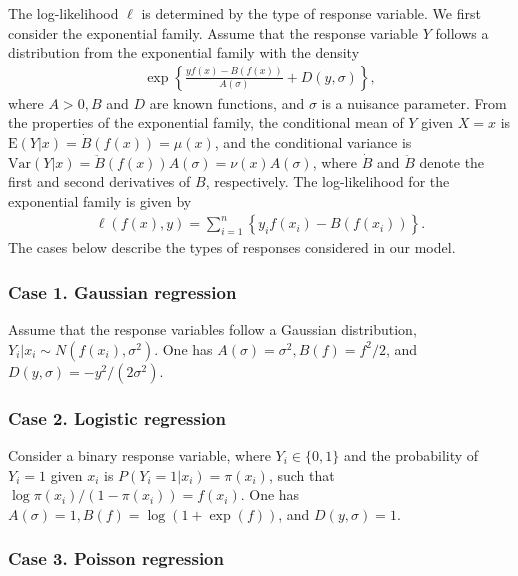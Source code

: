 The log-likelihood \(\ell\) is determined by the type of response variable. We first consider the exponential family. Assume that the response variable \(Y\) follows a distribution from the exponential family with the density
\begin{align*}
    \exp \left\{ \frac{y f(x) - B(f(x))}{A(\sigma)} + D(y, \sigma) \right\},
\end{align*}
where \(A > 0, B\) and \(D\) are known functions, and \(\sigma\) is a nuisance parameter. From the properties of the exponential family, the conditional mean of \(Y\) given \(X = x\) is \(\mathrm{E}(Y|x) = \dot{B}(f(x)) = \mu(x)\), and the conditional variance is \(\text{Var}(Y|x) = \ddot{B}(f(x)) A(\sigma) = \nu(x) A(\sigma)\), where \(\dot{B}\) and \(\ddot{B}\) denote the first and second derivatives of \(B\), respectively. The log-likelihood for the exponential family is given by
\begin{align}
    \ell(f(x), y) = \sum_{i=1}^{n} \left\{ y_i f(x_i) - B(f(x_i)) \right\}.
    \label{eq:loglik} 
\end{align}
The cases below describe the types of responses considered in our model.

\hypertarget{case-1.-gaussian-regression}{%
\subsubsection{Case 1. Gaussian regression}\label{case-1.-gaussian-regression}}

Assume that the response variables follow a Gaussian distribution, \(Y_i|x_i \sim N(f(x_i), \sigma^2)\). One has \(A(\sigma) = \sigma^2, B(f) = f^2/2\), and \(D(y, \sigma) = -y^2/(2\sigma^2)\).

\hypertarget{case-2.-logistic-regression}{%
\subsubsection{Case 2. Logistic regression}\label{case-2.-logistic-regression}}

Consider a binary response variable, where \(Y_i \in \{0, 1\}\) and the probability of \(Y_i=1\) given \(x_i\) is \(P(Y_i=1|x_i) = \pi(x_i)\), such that \(\log \pi(x_i)/ (1-\pi(x_i)) = f(x_i)\). One has \(A(\sigma) = 1, B(f) = \log(1 + \exp(f))\), and \(D(y, \sigma) = 1\).

\hypertarget{case-3.-poisson-regression}{%
\subsubsection{Case 3. Poisson regression}\label{case-3.-poisson-regression}}

